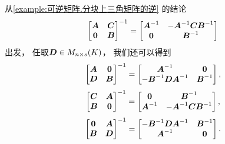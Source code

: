 \begin{remark}
从\cref{example:可逆矩阵.分块上三角矩阵的逆} 的结论\begin{equation*}
	\begin{bmatrix}
		\boldsymbol{A} & \boldsymbol{C} \\
		\boldsymbol0 & \boldsymbol{B}
	\end{bmatrix}^{-1}
	= \begin{bmatrix}
		\boldsymbol{A}^{-1} & -\boldsymbol{A}^{-1} \boldsymbol{C} \boldsymbol{B}^{-1} \\
		\boldsymbol0 & \boldsymbol{B}^{-1}
	\end{bmatrix}
\end{equation*}出发，
任取\(\boldsymbol{D} \in M_{n \times s}(K)\)，
我们还可以得到\begin{equation*}
	\begin{bmatrix}
		\boldsymbol{A} & \boldsymbol0 \\
		\boldsymbol{D} & \boldsymbol{B}
	\end{bmatrix}^{-1}
	= \begin{bmatrix}
		\boldsymbol{A}^{-1} & \boldsymbol0 \\
		-\boldsymbol{B}^{-1} \boldsymbol{D} \boldsymbol{A}^{-1} & \boldsymbol{B}^{-1}
	\end{bmatrix},
\end{equation*}\begin{equation*}
	\begin{bmatrix}
		\boldsymbol{C} & \boldsymbol{A} \\
		\boldsymbol{B} & \boldsymbol0
	\end{bmatrix}^{-1}
	= \begin{bmatrix}
		\boldsymbol0 & \boldsymbol{B}^{-1} \\
		\boldsymbol{A}^{-1} & -\boldsymbol{A}^{-1}\boldsymbol{C}\boldsymbol{B}^{-1}
	\end{bmatrix},
\end{equation*}\begin{equation*}
	\begin{bmatrix}
		\boldsymbol0 & \boldsymbol{A} \\
		\boldsymbol{B} & \boldsymbol{D}
	\end{bmatrix}^{-1}
	= \begin{bmatrix}
		-\boldsymbol{B}^{-1}\boldsymbol{D}\boldsymbol{A}^{-1} & \boldsymbol{B}^{-1} \\
		\boldsymbol{A}^{-1} & \boldsymbol0
	\end{bmatrix}.
\end{equation*}


\end{remark}
